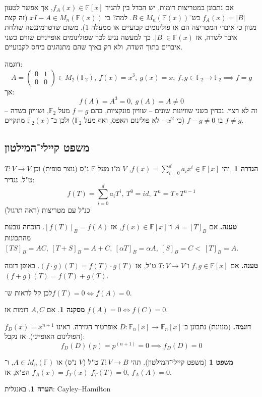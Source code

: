 \documentclass[a4paper]{article}
\newcommand\F         {\mathbb{F}}
\newcommand\co        {\colon}
\newcommand\pms[1]    {\begin{pmatrix}
		#1
\end{pmatrix}}
\newcommand\ag        {\alpha}
\theoremstyle{definition}
\newtheorem{Theorem}{\color{myblue}משפט}
\newtheorem{Definition}{\color{mygreen}הגדרה}
\newtheorem{Remark}{\color{mycyan}הערה}
\newtheorem{Collary}{\color{mymagenta}מסקנה}
\newcommand\cola [1] {\begin{Collary}#1\end{Collary}}
\newcommand\defi  [1] {\begin{Definition}#1\end{Definition}}
\newcommand\rmark [1] {\begin{Remark}#1\end{Remark}}
\begin{document}
	אם נתבונן במטריצות דומות, יש הבדל בין להגיד $f_A(x) \in \F[x]$, אך אפשר לטעון $f_A(x) = |B|$ כש־$B \in M_n(\F(x))$. למה? כי $xI - A \in M_n(\F(x))$ (זה קצת מנוון כי איברי המטריצה הם או פולינומים קבועיים או ממעלה 1). משום שדטרמיננטה שולחת איבר לשדה, אז $|B| \in \F(x)$. כך למעשה נגיע לכך שפולינומים אופייניים שווים כשני איברים בתוך השדה, ולא רק באיך שהם מתנהגים ביחס לקבועיים. 
	
	דוגמה: 
	\[ A = \pms{0 & 1 \\ 0 & 0} \in M_2(\F_2), \ f(x) = x^3, \ g(x) = x, \ f, g \in \F_2 \to \F_2 \implies f = g \]
	אך: 
	\[ f(A) = A^3 = 0, \ g(A) = A \neq 0 \]
	זה לא רצוי. נבחין בשני שוויונות שונים – שוויון פונקציות, בהם $f = g$ מעל $\F_2$, ושוויון בשדה – בו $f -g \neq 0$ (כי $-x^2$ לא פולינום האפס, ואף מעל $\F_2$) ולכן ב־$\F_2(x)$ מתקיים $f \neq g$. 
	
	\subsection{משפט קיילי־המילטון}
	
	\defi{יהי $f(x) = \sum_{i = 0}^{d}a_ix^i \in \F[x]$, $V$ מ"ו מעל $\F$ נ"ס (נוצר סופית) וכן $T \co V \to V$ ט"ל. נגדיר: 
		\[ f(T) = \sum_{i = 0}^{d}a_iT^{i}, \ T^0 = id, \ T^{n} = T \circ T^{n - 1} \]
	כנ"ל עם מטריצות (ראה תרגול)
	}

	
	\textbf{טענה. }אם $A = [T]_B$ ו־$f(x) \in \F[x]$, אז $[f(T)]_B = f(A)$. הוכחה נובעת מהתכונות $[TS]_B = AC, \ [T + S]_B = A + C, \ [\ag T]_B = \ag A, \ [S]_B = C<\ [T]_B = A$. 
	
	\textbf{טענה. }אם $f, g \in \F[x]$ ו־$T \co V \to V$ ט"ל, אז $(f \cdot g)(T) = f(T) \cdot g(T)$. באופן דומה $(f + g)(T) = f(T) + g(T)$. 
	
	לכן קל לראות ש־$f(T) = 0 \iff f(A) = 0$. 
	
	\cola{אם $A, C$ דומות אז $f(A) = 0 \iff f(C) = 0$. }
	
	\textbf{דוגמה. }(מנוונת) נתבונן ב־$D \co \F_n[x] \to \F_n[x]$ אופרטור הגזירה. ראינו $f_D(x) = x^{n + 1}$ (הפולינום האופייני). אז נקבל: 
	\[ f_D(D)(p) = p^{(n + 1)} = 0 \implies f_D(D) = 0 \]
	
	\begin{Theorem}[משפט קיילי־המילטון]
		תהי $T \co V \to B$ ט"ל ($V$ נ"ס) או $A \in M_n(\F)$, ו־$f_A(x) = f_T(x)$ הפ"א, אז $f_T(T) = 0, \ f_A(A) = 0$. 
	\end{Theorem}
	
	\rmark{באנגלית: Cayley–Hamilton}
	
\end{document}
